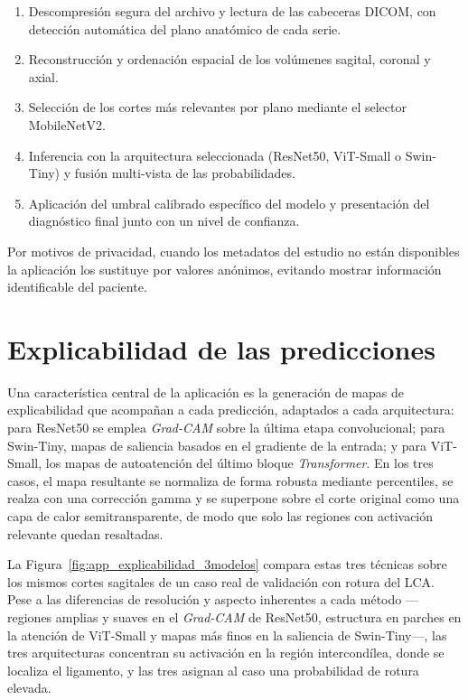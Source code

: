 \begin{enumerate}
    \item Descompresión segura del archivo y lectura de las cabeceras DICOM, con detección automática del plano anatómico de cada serie.
    \item Reconstrucción y ordenación espacial de los volúmenes sagital, coronal y axial.
    \item Selección de los cortes más relevantes por plano mediante el selector MobileNetV2.
    \item Inferencia con la arquitectura seleccionada (ResNet50, ViT-Small o Swin-Tiny) y fusión multi-vista de las probabilidades.
    \item Aplicación del umbral calibrado específico del modelo y presentación del diagnóstico final junto con un nivel de confianza.
\end{enumerate}

Por motivos de privacidad, cuando los metadatos del estudio no están disponibles la aplicación los sustituye por valores anónimos, evitando mostrar información identificable del paciente.

\section{Explicabilidad de las predicciones}

Una característica central de la aplicación es la generación de mapas de explicabilidad que acompañan a cada predicción, adaptados a cada arquitectura: para ResNet50 se emplea \textit{Grad-CAM} sobre la última etapa convolucional; para Swin-Tiny, mapas de saliencia basados en el gradiente de la entrada; y para ViT-Small, los mapas de autoatención del último bloque \textit{Transformer}. En los tres casos, el mapa resultante se normaliza de forma robusta mediante percentiles, se realza con una corrección gamma y se superpone sobre el corte original como una capa de calor semitransparente, de modo que solo las regiones con activación relevante quedan resaltadas.

La Figura~\ref{fig:app_explicabilidad_3modelos} compara estas tres técnicas sobre los mismos cortes sagitales de un caso real de validación con rotura del LCA. Pese a las diferencias de resolución y aspecto inherentes a cada método ---regiones amplias y suaves en el \textit{Grad-CAM} de ResNet50, estructura en parches en la atención de ViT-Small y mapas más finos en la saliencia de Swin-Tiny---, las tres arquitecturas concentran su activación en la región intercondílea, donde se localiza el ligamento, y las tres asignan al caso una probabilidad de rotura elevada.

